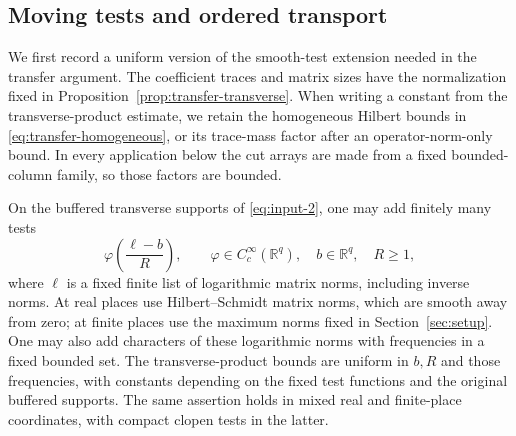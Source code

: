 \subsection{Moving tests and ordered transport}

We first record a uniform version of the smooth-test extension needed in
the transfer argument.  The coefficient traces and matrix sizes have the
normalization fixed in Proposition~\ref{prop:transfer-transverse}.  When
writing a constant from the transverse-product estimate, we retain the
homogeneous Hilbert bounds in \eqref{eq:transfer-homogeneous}, or its
trace-mass factor after an operator-norm-only bound.  In every application
below the cut arrays are made from a fixed bounded-column family, so those
factors are bounded.

\begin{lemma}\label{lem:heights-moving-tests}
On the buffered transverse supports of \eqref{eq:input-2}, one may add
finitely many tests
\[
 \varphi\!\left(\frac{\ell-b}{R}\right),
 \qquad \varphi\in C_c^\infty(\mathbb R^q),\quad
 b\in\mathbb R^q,\quad R\geq1,
\]
where $\ell$ is a fixed finite list of logarithmic matrix norms, including
inverse norms.  At real places use Hilbert--Schmidt matrix norms, which
are smooth away from zero; at finite places use the maximum norms fixed
in Section~\ref{sec:setup}.  One may also add characters of these logarithmic norms
with frequencies in a fixed bounded set.  The transverse-product bounds
are uniform in $b,R$ and those frequencies, with constants depending on
the fixed test functions and the original buffered supports.  The same
assertion holds in mixed real and finite-place coordinates, with compact
clopen tests in the latter.
\end{lemma}


